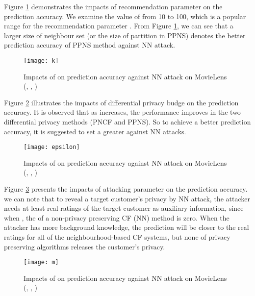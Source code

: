 \documentclass[11pt]{article}
\begin{document}
\newpage
Figure \ref{fig:k} demonstrates the impacts of recommendation parameter  on the prediction accuracy. We examine the value of  from 10 to 100, which is a popular range for the recommendation parameter . From Figure \ref{fig:k}, we can see that a larger size of neighbour set (or the size of partition in PPNS) denotes the better prediction accuracy of PPNS method against NN attack.
\begin{figure}[!h]
\centering
\texttt{[image: k]}
\caption{Impacts of  on prediction accuracy against NN attack on MovieLens (, , )}
\label{fig:k}
\end{figure}

Figure \ref{fig:epsilon} illustrates the impacts of differential privacy budge  on the prediction accuracy. It is observed that as  increases, the  performance improves in the two differential privacy methods (PNCF and PPNS). So to achieve a better prediction accuracy, it is suggested to set a greater  against NN attacks.
\begin{figure}[!h]
\centering
\texttt{[image: epsilon]}
\caption{Impacts of  on prediction accuracy against NN attack on MovieLens (, , )}
\label{fig:epsilon}
\end{figure}

Figure \ref{fig:m} presents the impacts of attacking parameter  on the prediction accuracy. we can note that to reveal a target customer's privacy by NN attack, the attacker needs at least  real ratings of the target customer as auxiliary information, since when , the  of a non-privacy preserving CF (NN) method is zero. When the attacker has more background knowledge, the prediction will be closer to the real ratings for all of the neighbourhood-based CF systems, but none of privacy preserving algorithms releases the customer's privacy.
\begin{figure}[!h]
\centering
\texttt{[image: m]}
\caption{Impacts of  on prediction accuracy against NN attack on MovieLens (, , )}
\label{fig:m}
\end{figure}
\end{document}
